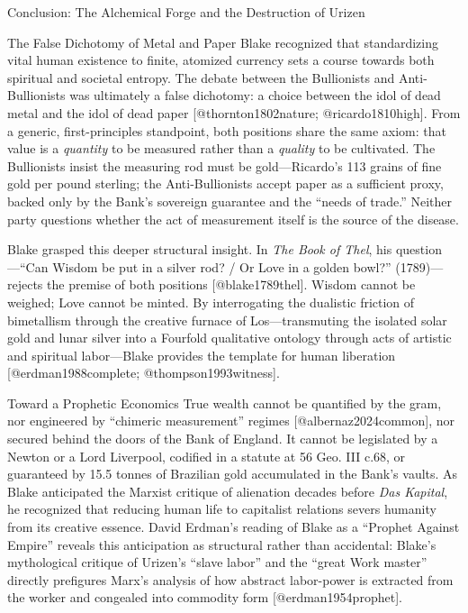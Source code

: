 \documentclass[
  ignorenonframetext,
]{beamer}
\begin{document}
\begin{frame}{Conclusion: The Alchemical Forge and the Destruction of
Urizen}
\begin{block}{The False Dichotomy of Metal and Paper}
\protect{}\label{the-false-dichotomy-of-metal-and-paper}
Blake recognized that standardizing vital human existence to finite,
atomized currency sets a course towards both spiritual and societal
entropy. The debate between the Bullionists and Anti-Bullionists was
ultimately a false dichotomy: a choice between the idol of dead metal
and the idol of dead paper {[}@thornton1802nature; @ricardo1810high{]}.
From a generic, first-principles standpoint, both positions share the
same axiom: that value is a \emph{quantity} to be measured rather than a
\emph{quality} to be cultivated. The Bullionists insist the measuring
rod must be gold---Ricardo's 113 grains of fine gold per pound sterling;
the Anti-Bullionists accept paper as a sufficient proxy, backed only by
the Bank's sovereign guarantee and the ``needs of trade.'' Neither party
questions whether the act of measurement itself is the source of the
disease.

Blake grasped this deeper structural insight. In \emph{The Book of
Thel}, his question---``Can Wisdom be put in a silver rod? / Or Love in
a golden bowl?'' (1789)---rejects the premise of both positions
{[}@blake1789thel{]}. Wisdom cannot be weighed; Love cannot be minted.
By interrogating the dualistic friction of bimetallism through the
creative furnace of Los---transmuting the isolated solar gold and lunar
silver into a Fourfold qualitative ontology through acts of artistic and
spiritual labor---Blake provides the template for human liberation
{[}@erdman1988complete; @thompson1993witness{]}.
\end{block}

\begin{block}{Toward a Prophetic Economics}
\protect{}\label{toward-a-prophetic-economics}
True wealth cannot be quantified by the gram, nor engineered by
``chimeric measurement'' regimes {[}@albernaz2024common{]}, nor secured
behind the doors of the Bank of England. It cannot be legislated by a
Newton or a Lord Liverpool, codified in a statute at 56 Geo. III c.68,
or guaranteed by 15.5 tonnes of Brazilian gold accumulated in the Bank's
vaults. As Blake anticipated the Marxist critique of alienation decades
before \emph{Das Kapital}, he recognized that reducing human life to
capitalist relations severs humanity from its creative essence. David
Erdman's reading of Blake as a ``Prophet Against Empire'' reveals this
anticipation as structural rather than accidental: Blake's mythological
critique of Urizen's ``slave labor'' and the ``great Work master''
directly prefigures Marx's analysis of how abstract labor-power is
extracted from the worker and congealed into commodity form
{[}@erdman1954prophet{]}.


\end{block}
\end{frame}
\end{document}
